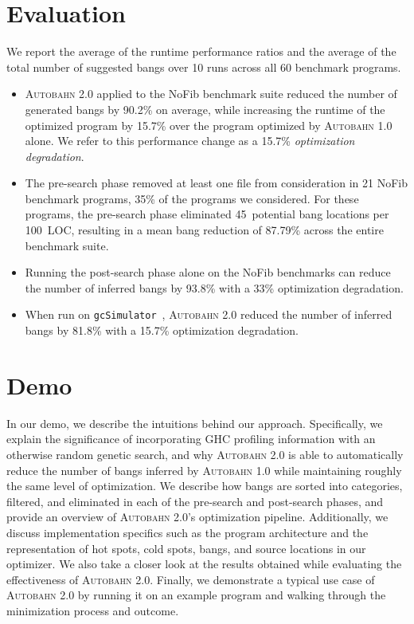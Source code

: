 \documentclass[sigplan,screen]{acmart}
\newcommand{\hotspots}[0]{hot spots}
\newcommand{\coldspots}[0]{cold spots}
\newcommand{\Ao}[0]{\textsc{Autobahn 1.0}}
\newcommand{\At}[0]{\textsc{Autobahn 2.0}}
\newcommand{\preopt}[0]{pre-search}
\newcommand{\postopt}[0]{post-search}
\begin{document}
\section{Evaluation}
We report the average of the runtime performance ratios
and the average of the total number of suggested bangs
over 10 runs across all 60 benchmark programs.  
\begin{itemize}
  \item \At{} applied to the NoFib benchmark suite reduced
    the number of generated bangs by 90.2\% on average, while
    increasing the runtime of the optimized program by 15.7\% over the
    program optimized by \Ao{} alone. We refer to this
    performance change as a 15.7\% \textit{optimization degradation}.
  \item The \preopt{} phase removed at least
    one file from consideration in 21 NoFib benchmark programs,
    35\% of the programs we considered.
    For these programs, the \preopt{} phase eliminated
    45~potential bang locations per 100~LOC, resulting in a mean bang
    reduction of 87.79\% across the entire benchmark suite. 
  \item Running the \postopt{} phase alone on the NoFib benchmarks
    can reduce the number of inferred bangs by
    93.8\% with a 33\% optimization degradation.
  \item When run on 
    \texttt{gcSimulator}~\cite{Ricci13}, 
    \At{} reduced the number of inferred bangs by
    81.8\% with a 15.7\% optimization degradation.
    \end{itemize}

\section{Demo{}}

In our demo, we describe the intuitions  behind our approach. 
Specifically, we explain the significance of incorporating GHC profiling
information with an otherwise random genetic search, and why \At{} is able to
automatically reduce the number of bangs inferred by \Ao{} while maintaining roughly the same
level of optimization. We describe how bangs are sorted
into categories, filtered, and eliminated in each of the \preopt{} and \postopt{} phases, and provide
an overview of \At{}'s optimization pipeline.  
Additionally, we discuss implementation specifics such as the program architecture and 
the representation of \hotspots{}, \coldspots{}, bangs, and source locations in our optimizer.
We also take a closer look at the results obtained while evaluating the effectiveness of \At{}. 
Finally, we demonstrate a typical use case of \At{} by running it on an example program and 
walking through the minimization process and outcome.




\end{document}
